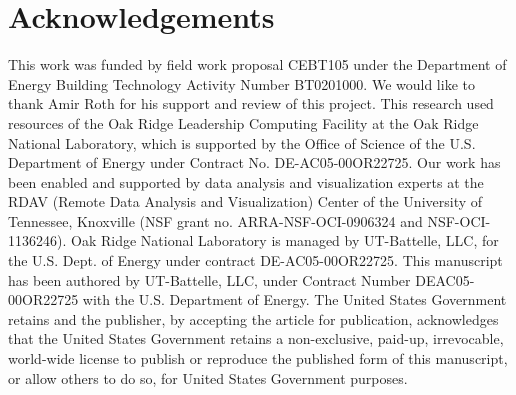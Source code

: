 \documentclass[preprint, review, 12pt]{elsarticle}
\begin{document}
\section{Acknowledgements}
This work was funded by field work proposal CEBT105 under the Department of Energy Building Technology Activity Number BT0201000. We would like to thank Amir Roth for his support and review of this project. This research used resources of the Oak Ridge Leadership Computing Facility at the Oak Ridge National Laboratory, which is supported by the Office of Science of the U.S. Department of Energy under Contract No. DE-AC05-00OR22725. Our work has been enabled and supported by data analysis and visualization experts at the RDAV (Remote Data Analysis and Visualization) Center of the University of Tennessee, Knoxville (NSF grant no. ARRA-NSF-OCI-0906324 and NSF-OCI-1136246). Oak Ridge National Laboratory is managed by UT-Battelle, LLC, for the U.S. Dept. of Energy under contract DE-AC05-00OR22725. This manuscript has been authored by UT-Battelle, LLC, under Contract Number DEAC05-00OR22725 with the U.S. Department of Energy. The United States Government retains and the publisher, by accepting the article for publication, acknowledges that the United States Government retains a non-exclusive, paid-up, irrevocable, world-wide license to publish or reproduce the published form of this manuscript, or allow others to do so, for United States Government purposes.














\end{document}
